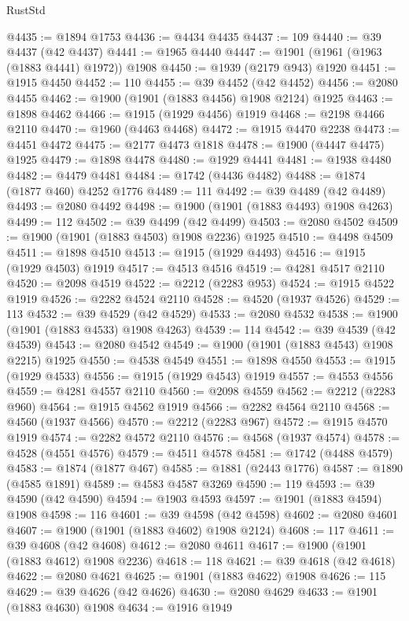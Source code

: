\begin{lexlean}{RustStd}
\begin{coremodule}
@4435 := @1894 @1753
@4436 := @4434 @4435
@4437 := 109
@4440 := @39 @4437 (@42 @4437)
@4441 := @1965 @4440
@4447 := @1901 (@1961 (@1963 (@1883 @4441) @1972)) @1908
@4450 := @1939 (@2179 @943) @1920
@4451 := @1915 @4450
@4452 := 110
@4455 := @39 @4452 (@42 @4452)
@4456 := @2080 @4455
@4462 := @1900 (@1901 (@1883 @4456) @1908 @2124) @1925
@4463 := @1898 @4462
@4466 := @1915 (@1929 @4456) @1919
@4468 := @2198 @4466 @2110
@4470 := @1960 (@4463 @4468)
@4472 := @1915 @4470 @2238
@4473 := @4451 @4472
@4475 := @2177 @4473 @1818
@4478 := @1900 (@4447 @4475) @1925
@4479 := @1898 @4478
@4480 := @1929 @4441
@4481 := @1938 @4480
@4482 := @4479 @4481
@4484 := @1742 (@4436 @4482)
@4488 := @1874 (@1877 @460) @4252 @1776
@4489 := 111
@4492 := @39 @4489 (@42 @4489)
@4493 := @2080 @4492
@4498 := @1900 (@1901 (@1883 @4493) @1908 @4263)
@4499 := 112
@4502 := @39 @4499 (@42 @4499)
@4503 := @2080 @4502
@4509 := @1900 (@1901 (@1883 @4503) @1908 @2236) @1925
@4510 := @4498 @4509
@4511 := @1898 @4510
@4513 := @1915 (@1929 @4493)
@4516 := @1915 (@1929 @4503) @1919
@4517 := @4513 @4516
@4519 := @4281 @4517 @2110
@4520 := @2098 @4519
@4522 := @2212 (@2283 @953)
@4524 := @1915 @4522 @1919
@4526 := @2282 @4524 @2110
@4528 := @4520 (@1937 @4526)
@4529 := 113
@4532 := @39 @4529 (@42 @4529)
@4533 := @2080 @4532
@4538 := @1900 (@1901 (@1883 @4533) @1908 @4263)
@4539 := 114
@4542 := @39 @4539 (@42 @4539)
@4543 := @2080 @4542
@4549 := @1900 (@1901 (@1883 @4543) @1908 @2215) @1925
@4550 := @4538 @4549
@4551 := @1898 @4550
@4553 := @1915 (@1929 @4533)
@4556 := @1915 (@1929 @4543) @1919
@4557 := @4553 @4556
@4559 := @4281 @4557 @2110
@4560 := @2098 @4559
@4562 := @2212 (@2283 @960)
@4564 := @1915 @4562 @1919
@4566 := @2282 @4564 @2110
@4568 := @4560 (@1937 @4566)
@4570 := @2212 (@2283 @967)
@4572 := @1915 @4570 @1919
@4574 := @2282 @4572 @2110
@4576 := @4568 (@1937 @4574)
@4578 := @4528 (@4551 @4576)
@4579 := @4511 @4578
@4581 := @1742 (@4488 @4579)
@4583 := @1874 (@1877 @467)
@4585 := @1881 (@2443 @1776)
@4587 := @1890 (@4585 @1891)
@4589 := @4583 @4587 @3269
@4590 := 119
@4593 := @39 @4590 (@42 @4590)
@4594 := @1903 @4593
@4597 := @1901 (@1883 @4594) @1908
@4598 := 116
@4601 := @39 @4598 (@42 @4598)
@4602 := @2080 @4601
@4607 := @1900 (@1901 (@1883 @4602) @1908 @2124)
@4608 := 117
@4611 := @39 @4608 (@42 @4608)
@4612 := @2080 @4611
@4617 := @1900 (@1901 (@1883 @4612) @1908 @2236)
@4618 := 118
@4621 := @39 @4618 (@42 @4618)
@4622 := @2080 @4621
@4625 := @1901 (@1883 @4622) @1908
@4626 := 115
@4629 := @39 @4626 (@42 @4626)
@4630 := @2080 @4629
@4633 := @1901 (@1883 @4630) @1908
@4634 := @1916 @1949

\end{coremodule}
\end{lexlean}
